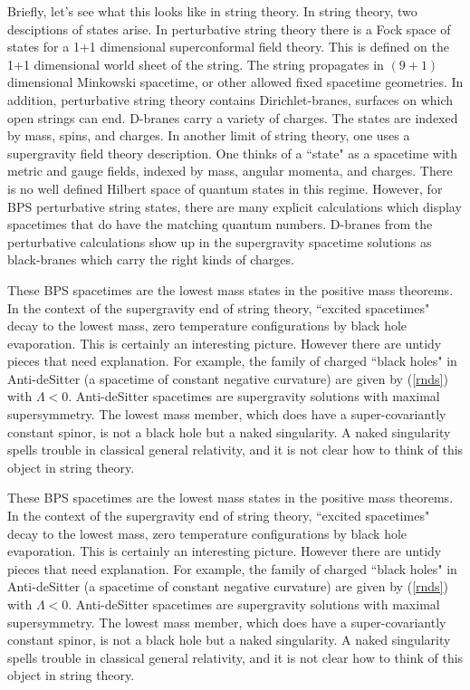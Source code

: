 \documentclass[12pt]{article}
\begin{document}
Briefly, let's see what this looks like in string theory.
In string theory, two desciptions of states arise.
In perturbative string theory there is a Fock space of states
for a 1+1 dimensional superconformal field theory. This is defined on
the 1+1  dimensional world sheet of the string.
The string propagates in $(9+1)$ dimensional
Minkowski spacetime, or other allowed fixed spacetime geometries. In addition,
perturbative string theory contains Dirichlet-branes, surfaces on which
open strings can
end. D-branes carry a variety of charges.  The states are indexed
by mass, spins, and charges. In another limit of string theory, one
uses a  supergravity field theory description. One thinks of a ``state"
as a spacetime with metric and gauge fields, indexed by mass, angular momenta,
and charges. There is no well defined Hilbert space of quantum states in
this regime.
However, for BPS  perturbative string states, there are many
explicit calculations which display spacetimes that do have the matching
quantum numbers.
D-branes from the perturbative calculations show up in the supergravity
spacetime solutions as black-branes which carry the right kinds of charges.

These BPS spacetimes are the lowest mass states in the
positive mass theorems. In the context of the supergravity end of string
theory, ``excited spacetimes" decay to the lowest mass,
zero temperature configurations by black hole evaporation. This is certainly an
interesting picture. However there are untidy pieces that need explanation.
For example, the family of charged ``black holes" in Anti-deSitter (a
spacetime of constant
negative curvature) are given by (\ref{rnds}) with $\Lambda <0$.
Anti-deSitter spacetimes are
supergravity solutions with maximal supersymmetry.
The lowest mass member, which does have a super-covariantly constant spinor,
is not a black hole but a naked singularity. A naked singularity spells
trouble in classical
general relativity, and it is not
clear how  to think of this object in string theory.

These BPS spacetimes are the lowest mass states in the
positive mass theorems. In the context of the supergravity end of string
theory, ``excited spacetimes" decay to the lowest mass,
zero temperature configurations by black hole evaporation. This is certainly an
interesting picture. However there are untidy pieces that need explanation.
For example, the family of charged ``black holes" in Anti-deSitter (a
spacetime of constant
negative curvature) are given by (\ref{rnds}) with $\Lambda <0$.
Anti-deSitter spacetimes are
supergravity solutions with maximal supersymmetry.
The lowest mass member, which does have a super-covariantly constant spinor,
is not a black hole but a naked singularity. A naked singularity spells
trouble in classical
general relativity, and it is not
clear how  to think of this object in string theory.
\end{document}
